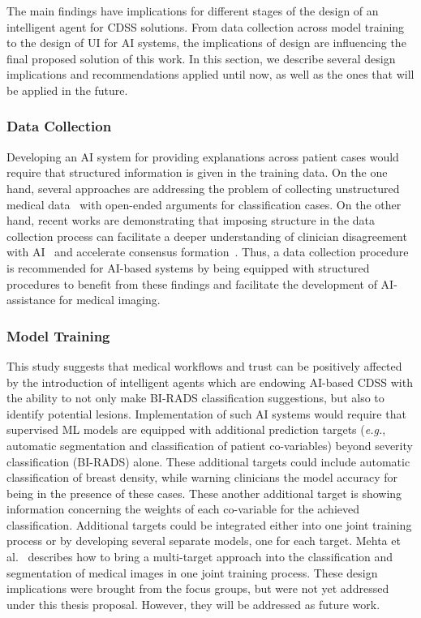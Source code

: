 The main findings have implications for different stages of the design of an intelligent agent for CDSS solutions.
From data collection across model training to the design of UI for AI systems, the implications of design are influencing the final proposed solution of this work.
In this section, we describe several design implications and recommendations applied until now, as well as the ones that will be applied in the future.

\subsubsection{Data Collection}

Developing an AI system for providing explanations across patient cases would require that structured information is given in the training data.
On the one hand, several approaches are addressing the problem of collecting unstructured medical data~\cite{10.1145/3308560.3317085, SchaekermannMike2020} with open-ended arguments for classification cases.
On the other hand, recent works are demonstrating that imposing structure in the data collection process can facilitate a deeper understanding of clinician disagreement with AI~\cite{10.1145/3308560.3317085} and accelerate consensus formation~\cite{10.1145/3313831.3376506}.
Thus, a data collection procedure is recommended for AI-based systems by being equipped with structured procedures to benefit from these findings and facilitate the development of AI-assistance for medical imaging.

\subsubsection{Model Training}

This study suggests that medical workflows and trust can be positively affected by the introduction of intelligent agents which are endowing AI-based CDSS with the ability to not only make BI-RADS classification suggestions, but also to identify potential lesions.
Implementation of such AI systems would require that supervised ML models are equipped with additional prediction targets ({\it e.g.}, automatic segmentation and classification of patient co-variables) beyond severity classification (BI-RADS) alone.
These additional targets could include automatic classification of breast density, while warning clinicians the model accuracy for being in the presence of these cases.
These another additional target is showing information concerning the weights of each co-variable for the achieved classification.
Additional targets could be integrated either into one joint training process or by developing several separate models, one for each target.
Mehta et al.~\cite{10.1007/978-3-030-00934-2_99} describes how to bring a multi-target approach into the classification and segmentation of medical images in one joint training process.
These design implications were brought from the focus groups, but were not yet addressed under this thesis proposal.
However, they will be addressed as future work.

